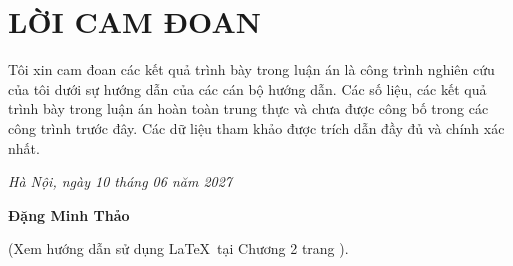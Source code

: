 
\chapter*{LỜI CAM ĐOAN}
%

Tôi xin cam đoan các kết quả trình bày trong luận án là công trình nghiên cứu của tôi dưới sự hướng dẫn của các cán bộ hướng dẫn. Các số liệu, các kết quả trình bày trong luận án hoàn toàn trung thực và chưa được công bố trong các công trình trước đây. Các dữ liệu tham khảo được trích dẫn đầy đủ và chính xác nhất.

\hfill \textit{Hà Nội, ngày 10 tháng 06 năm 2027}
\newline
\newline
\newline

\hfill {\bf Đặng Minh Thảo}\hspace{1.5cm}
\newline
\begin{center}
{\color{red}(Xem hướng dẫn sử dụng \LaTeX\ tại Chương 2 trang \pageref{chchukytapthedathanhphan}).}
\end{center}